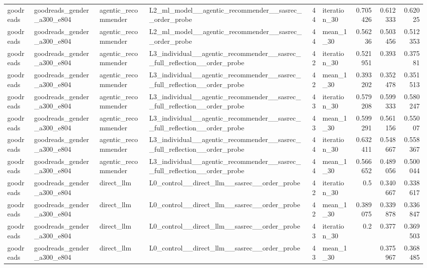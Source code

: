 \begin{table}[htbp!]
\begin{tabular}{llllrlrrr}
goodreads & goodreads\_gender\_a300\_e804 & agentic\_recommender & L2\_ml\_model\_\_agentic\_recommender\_\_sasrec\_\_order\_probe & 44 & iteration\_30 & 0.705426 & 0.612333 & 0.62025 \\
goodreads & goodreads\_gender\_a300\_e804 & agentic\_recommender & L2\_ml\_model\_\_agentic\_recommender\_\_sasrec\_\_order\_probe & 44 & mean\_1\_30 & 0.56236 & 0.503456 & 0.512353 \\
goodreads & goodreads\_gender\_a300\_e804 & agentic\_recommender & L3\_individual\_\_agentic\_recommender\_\_sasrec\_\_full\_reflection\_\_order\_probe & 42 & iteration\_30 & 0.521951 & 0.393 & 0.37581 \\
goodreads & goodreads\_gender\_a300\_e804 & agentic\_recommender & L3\_individual\_\_agentic\_recommender\_\_sasrec\_\_full\_reflection\_\_order\_probe & 42 & mean\_1\_30 & 0.393202 & 0.352478 & 0.351513 \\
goodreads & goodreads\_gender\_a300\_e804 & agentic\_recommender & L3\_individual\_\_agentic\_recommender\_\_sasrec\_\_full\_reflection\_\_order\_probe & 43 & iteration\_30 & 0.579208 & 0.599333 & 0.580247 \\
goodreads & goodreads\_gender\_a300\_e804 & agentic\_recommender & L3\_individual\_\_agentic\_recommender\_\_sasrec\_\_full\_reflection\_\_order\_probe & 43 & mean\_1\_30 & 0.599291 & 0.561156 & 0.55007 \\
goodreads & goodreads\_gender\_a300\_e804 & agentic\_recommender & L3\_individual\_\_agentic\_recommender\_\_sasrec\_\_full\_reflection\_\_order\_probe & 44 & iteration\_30 & 0.632411 & 0.548667 & 0.558367 \\
goodreads & goodreads\_gender\_a300\_e804 & agentic\_recommender & L3\_individual\_\_agentic\_recommender\_\_sasrec\_\_full\_reflection\_\_order\_probe & 44 & mean\_1\_30 & 0.566652 & 0.489056 & 0.500044 \\
goodreads & goodreads\_gender\_a300\_e804 & direct\_llm & L0\_control\_\_direct\_llm\_\_sasrec\_\_order\_probe & 42 & iteration\_30 & 0.5 & 0.340667 & 0.338617 \\
goodreads & goodreads\_gender\_a300\_e804 & direct\_llm & L0\_control\_\_direct\_llm\_\_sasrec\_\_order\_probe & 42 & mean\_1\_30 & 0.389075 & 0.339878 & 0.336847 \\
goodreads & goodreads\_gender\_a300\_e804 & direct\_llm & L0\_control\_\_direct\_llm\_\_sasrec\_\_order\_probe & 43 & iteration\_30 & 0.2 & 0.377 & 0.369503 \\
goodreads & goodreads\_gender\_a300\_e804 & direct\_llm & L0\_control\_\_direct\_llm\_\_sasrec\_\_order\_probe & 43 & mean\_1\_30 & \textemdash{} & 0.375967 & 0.368485 \\

\end{tabular}
\end{table}
